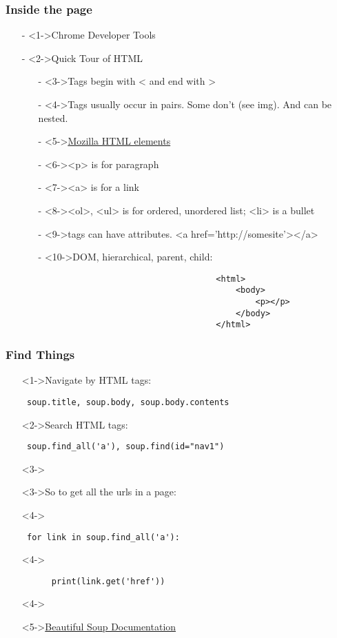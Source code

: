 \documentclass[compress, black]{beamer}
\begin{document}
\begin{frame}[fragile]
	\frametitle{Inside the page}
	\begin{enumerate}
		\item[-]<1->Chrome Developer Tools
		\item[-]<2->Quick Tour of HTML
			\begin{enumerate}
			\item[-]<3->Tags begin with < and end with >
			\item[-]<4->Tags usually occur in pairs. Some don't (see img). And can be nested.
			\item[-]<5->\href{https://developer.mozilla.org/en-US/docs/Web/HTML/Element}{Mozilla HTML elements}
			\item[-]<6-><p> is for paragraph
			\item[-]<7-><a> is for a link
			\item[-]<8-><ol>, <ul> is for ordered, unordered list; <li> is a bullet
			\item[-]<9->tags can have attributes. <a href='http://somesite'></a>
			\item[-]<10->DOM, hierarchical, parent, child:
						\begin{verbatim} 
									<html>
									    <body>
									        <p></p>
									    </body>
									</html>
				\end{verbatim}
		\end{enumerate}
	\end{enumerate}
\end{frame}

\begin{frame}[fragile]
	\frametitle{Find Things}
	\begin{enumerate}
		\item[]<1->Navigate by HTML tags: \begin{verbatim} soup.title, soup.body, soup.body.contents \end{verbatim}
		\item[]<2->Search HTML tags: 	  \begin{verbatim} soup.find_all('a'), soup.find(id="nav1") \end{verbatim}
		\item[]<3->
		\item[]<3->So to get all the urls in a page:
		\item[]<4->\begin{verbatim} for link in soup.find_all('a'): \end{verbatim}
		\item[]<4->\begin{verbatim}      print(link.get('href'))	 \end{verbatim}						
		\item[]<4->
		\item[]<5->\href{http://www.crummy.com/software/BeautifulSoup/bs4/doc/}{Beautiful Soup Documentation}
	\end{enumerate}
\end{frame}
\end{document}
